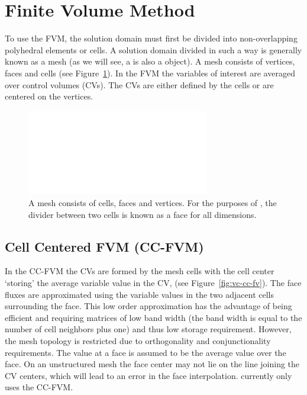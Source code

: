 \section{Finite Volume Method}

To use the FVM, the solution domain must first be divided into
non-overlapping polyhedral elements or cells.  A solution domain
divided in such a way is generally known as a mesh (as we will see, a
 is also a \FiPy{} object).  A mesh consists of vertices,
faces and cells (see Figure~\ref{fig:meshcartoon}).  In the FVM the
variables of interest are averaged over control volumes (CVs).  The
CVs are either defined by the cells or are centered on the vertices.

\begin{figure}
 \begin{center}
 \includegraphics[width=8cm]{numerical/meshcartoon.pdf}
 \caption{A mesh consists of cells, faces and vertices. For the
 purposes of \FiPy{}, the divider between two cells is known as a face
 for all dimensions.}  \label{fig:meshcartoon} \end{center}
\end{figure}

\subsection{Cell Centered FVM (CC-FVM)}

In the CC-FVM the CVs are formed by the mesh cells with the cell
center `storing' the average variable value in the CV, (see
Figure~\ref{fig:vc-cc-fv}). The face fluxes are approximated using the
variable values in the two adjacent cells surrounding the face. This
low order approximation has the advantage of being efficient and
requiring matrices of low band width (the band width is equal to the
number of cell neighbors plus one) and thus low storage
requirement. However, the mesh topology is restricted due to
orthogonality and conjunctionality requirements. The value at a face is
assumed to be the average value over the face. On an unstructured mesh
the face center may not lie on the line joining the CV centers, which
will lead to an error in the face interpolation. \FiPy{} currently
only uses the CC-FVM.

